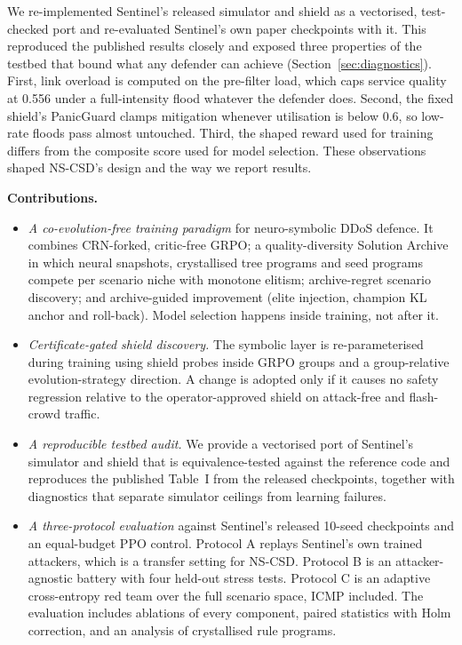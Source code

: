 We re-implemented Sentinel's released simulator and shield as a vectorised,
test-checked port and re-evaluated Sentinel's own paper checkpoints with it.
This reproduced the published results closely and exposed three properties of
the testbed that bound what any defender can achieve (Section~\ref{sec:diagnostics}).
First, link overload is computed on the pre-filter load, which caps service
quality at 0.556 under a full-intensity flood whatever the defender does.
Second, the fixed shield's PanicGuard clamps mitigation whenever utilisation is
below 0.6, so low-rate floods pass almost untouched. Third, the shaped reward
used for training differs from the composite score used for model selection.
These observations shaped NS-CSD's design and the way we report results.

\textbf{Contributions.}
\begin{itemize}
\item \emph{A co-evolution-free training paradigm} for neuro-symbolic
DDoS defence. It combines CRN-forked, critic-free GRPO; a quality-diversity
Solution Archive in which neural snapshots, crystallised tree programs and seed
programs compete per scenario niche with monotone elitism; archive-regret
scenario discovery; and archive-guided improvement (elite injection, champion
KL anchor and roll-back). Model selection happens inside training, not after it.
\item \emph{Certificate-gated shield discovery.} The symbolic layer is
re-parameterised during training using shield probes inside GRPO groups and a
group-relative evolution-strategy direction. A change is adopted only if it
causes no safety regression relative to the operator-approved shield on
attack-free and flash-crowd traffic.
\item \emph{A reproducible testbed audit.} We provide a vectorised port of
Sentinel's simulator and shield that is equivalence-tested against the
reference code and reproduces the published Table~I from the released
checkpoints, together with diagnostics that separate simulator ceilings from
learning failures.
\item \emph{A three-protocol evaluation} against Sentinel's released 10-seed
checkpoints and an equal-budget PPO control. Protocol A replays Sentinel's own
trained attackers, which is a transfer setting for NS-CSD. Protocol B is an
attacker-agnostic battery with four held-out stress tests. Protocol C is an
adaptive cross-entropy red team over the full scenario space, ICMP included.
The evaluation includes ablations of every component, paired statistics with
Holm correction, and an analysis of crystallised rule programs.
\end{itemize}

